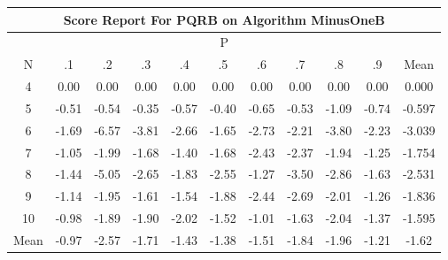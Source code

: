\documentclass[11pt,a4paper]{report}
\begin{document}
\begin{longtable}{ | c || c | c | c | c | c | c | c | c | c || c |}
\hline
\multicolumn{11}{|c|}{ Score Report For PQRB on Algorithm MinusOneB} \\
\hline
\multicolumn{11}{|c|}{ P } \\
\hline
N & .1 & .2 & .3 & .4 & .5 & .6 & .7 & .8 & .9 & Mean\\
 \hline
 \hline
 \endhead
  4 &  \cellcolor[HTML]{FFFFFF} 0.00 &  \cellcolor[HTML]{FFFFFF} 0.00 &  \cellcolor[HTML]{FFFFFF} 0.00 &  \cellcolor[HTML]{FFFFFF} 0.00 &  \cellcolor[HTML]{FFFFFF} 0.00 &  \cellcolor[HTML]{FFFFFF} 0.00 &  \cellcolor[HTML]{FFFFFF} 0.00 &  \cellcolor[HTML]{FFFFFF} 0.00 &  \cellcolor[HTML]{FFFFFF} 0.00 & 0.000 \\
  5 &  \cellcolor[HTML]{FFEFEF} -0.51 &  \cellcolor[HTML]{FFEFEF} -0.54 &  \cellcolor[HTML]{FFF7F7} -0.35 &  \cellcolor[HTML]{FFEFEF} -0.57 &  \cellcolor[HTML]{FFF7F7} -0.40 &  \cellcolor[HTML]{FFEFEF} -0.65 &  \cellcolor[HTML]{FFEFEF} -0.53 &  \cellcolor[HTML]{FFE7E7} -1.09 &  \cellcolor[HTML]{FFEFEF} -0.74 & -0.597 \\
  6 &  \cellcolor[HTML]{FFD7D7} -1.69 &  \cellcolor[HTML]{FF5858} -6.57 &  \cellcolor[HTML]{FF9F9F} -3.81 &  \cellcolor[HTML]{FFBFBF} -2.66 &  \cellcolor[HTML]{FFD7D7} -1.65 &  \cellcolor[HTML]{FFB7B7} -2.73 &  \cellcolor[HTML]{FFC7C7} -2.21 &  \cellcolor[HTML]{FF9F9F} -3.80 &  \cellcolor[HTML]{FFC7C7} -2.23 & -3.039 \\
  7 &  \cellcolor[HTML]{FFE7E7} -1.05 &  \cellcolor[HTML]{FFCFCF} -1.99 &  \cellcolor[HTML]{FFD7D7} -1.68 &  \cellcolor[HTML]{FFDFDF} -1.40 &  \cellcolor[HTML]{FFD7D7} -1.68 &  \cellcolor[HTML]{FFBFBF} -2.43 &  \cellcolor[HTML]{FFC7C7} -2.37 &  \cellcolor[HTML]{FFCFCF} -1.94 &  \cellcolor[HTML]{FFDFDF} -1.25 & -1.754 \\
  8 &  \cellcolor[HTML]{FFD7D7} -1.44 &  \cellcolor[HTML]{FF8080} -5.05 &  \cellcolor[HTML]{FFBFBF} -2.65 &  \cellcolor[HTML]{FFCFCF} -1.83 &  \cellcolor[HTML]{FFBFBF} -2.55 &  \cellcolor[HTML]{FFDFDF} -1.27 &  \cellcolor[HTML]{FFA7A7} -3.50 &  \cellcolor[HTML]{FFB7B7} -2.86 &  \cellcolor[HTML]{FFD7D7} -1.63 & -2.531 \\
  9 &  \cellcolor[HTML]{FFDFDF} -1.14 &  \cellcolor[HTML]{FFCFCF} -1.95 &  \cellcolor[HTML]{FFD7D7} -1.61 &  \cellcolor[HTML]{FFD7D7} -1.54 &  \cellcolor[HTML]{FFCFCF} -1.88 &  \cellcolor[HTML]{FFBFBF} -2.44 &  \cellcolor[HTML]{FFBFBF} -2.69 &  \cellcolor[HTML]{FFCFCF} -2.01 &  \cellcolor[HTML]{FFDFDF} -1.26 & -1.836 \\
  10 &  \cellcolor[HTML]{FFE7E7} -0.98 &  \cellcolor[HTML]{FFCFCF} -1.89 &  \cellcolor[HTML]{FFCFCF} -1.90 &  \cellcolor[HTML]{FFCFCF} -2.02 &  \cellcolor[HTML]{FFD7D7} -1.52 &  \cellcolor[HTML]{FFE7E7} -1.01 &  \cellcolor[HTML]{FFD7D7} -1.63 &  \cellcolor[HTML]{FFCFCF} -2.04 &  \cellcolor[HTML]{FFDFDF} -1.37 & -1.595 \\
 \hline
 \hline
Mean &  \cellcolor[HTML]{FFE7E7} -0.97 &  \cellcolor[HTML]{FFBFBF} -2.57 &  \cellcolor[HTML]{FFD7D7} -1.71 &  \cellcolor[HTML]{FFD7D7} -1.43 &  \cellcolor[HTML]{FFDFDF} -1.38 &  \cellcolor[HTML]{FFD7D7} -1.51 &  \cellcolor[HTML]{FFCFCF} -1.84 &  \cellcolor[HTML]{FFCFCF} -1.96 &  \cellcolor[HTML]{FFDFDF} -1.21 &  \cellcolor[HTML]{FFD7D7} -1.62
\end{longtable}
\end{document}

